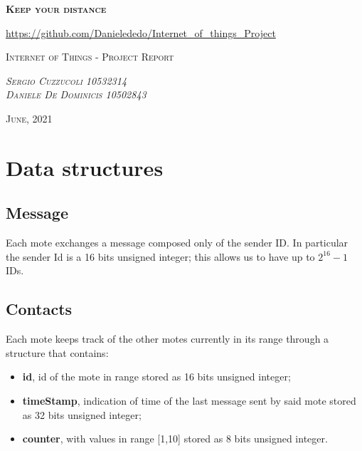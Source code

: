 \documentclass[12pt]{article}
\begin{document}
\begin{titlepage}
	\centering
	{\scshape\Huge\textbf{Keep your distance}\par}
	\vspace{1cm}
		\href{https://github.com/Danielededo/Internet_of_things_Project}{https://github.com/Danielededo/Internet_of_things_Project}
	\vspace{1cm}

	{\scshape\Large Internet of Things - Project Report\par}
	\vspace{2cm}
	{\scshape\Large\emph{Sergio Cuzzucoli 10532314}\\ \emph{Daniele De Dominicis 10502843}\par}
	\vspace{4cm}
	{\scshape\normalsize{June, 2021}}
\end{titlepage}


\section{Data structures}

\subsection{Message}
Each mote exchanges a message composed only of the sender ID. In particular the sender Id is a 16 bits unsigned integer; this allows us to have up to \(2^{16}-1\) IDs.

\subsection{Contacts}
Each mote keeps track of the other motes currently in its range through a structure that contains:
\begin{itemize}
  \item \textbf{id}, id of the mote in range stored as 16 bits unsigned integer;
  \item \textbf{timeStamp}, indication of time of the last message sent by said mote stored as 32 bits unsigned integer;
  \item \textbf{counter}, with values in range [1,10] stored as 8 bits unsigned integer.
\end{itemize}
\end{document}

